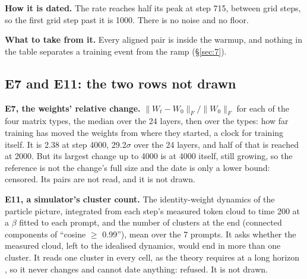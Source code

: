 \documentclass[11pt]{article}
\begin{document}
\textbf{How it is dated.} The rate reaches half its peak at step 715, between grid steps, so the first grid step past it is 1000. There is no noise and no floor.

\textbf{What to take from it.} Every aligned pair is inside the warmup, and nothing in the table separates a training event from the ramp (\S\ref{sec:7}).

\subsection{E7 and E11: the two rows not drawn}\label{sec:D:E7}\label{sec:D:E11}

\textbf{E7, the weights' relative change.} $\|W_{t} - W_{0}\|_{F} / \|W_{0}\|_{F}$ for each of the four matrix types, the median over the 24 layers, then over the types: how far training has moved the weights from where they started, a clock for training itself. It is 2.38 at step 4000, 29.2$\sigma $ over the 24 layers, and half of that is reached at 2000. But its largest change up to 4000 is at 4000 itself, still growing, so the reference is not the change's full size and the date is only a lower bound: censored. Its pairs are not read, and it is not drawn.

\textbf{E11, a simulator's cluster count.} The identity-weight dynamics of the particle picture, integrated from each step's measured token cloud to time 200 at a $\beta $ fitted to each prompt, and the number of clusters at the end (connected components of ``cosine $\geq $ 0.99''), mean over the 7 prompts. It asks whether the measured cloud, left to the idealised dynamics, would end in more than one cluster. It reads one cluster in every cell, as the theory requires at a long horizon \citep{geshkovski2023}, so it never changes and cannot date anything: refused. It is not drawn.



\end{document}
